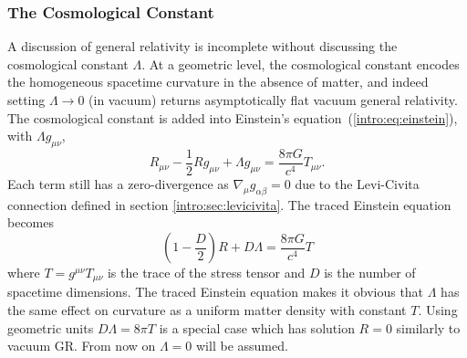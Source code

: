 \subsubsection{The Cosmological Constant} \label{intro:sec:cosmology}
A discussion of general relativity is incomplete without discussing the cosmological constant $\Lambda$. At a geometric level, the cosmological constant encodes the homogeneous spacetime curvature in the absence of matter, and indeed setting $\Lambda\rightarrow 0$ (in vacuum) returns asymptotically flat vacuum general relativity. The cosmological constant is added into Einstein's equation~(\ref{intro:eq:einstein}), with $\Lambda g_{\mu\nu}$,
\begin{equation} \label{intro:eq:einsteinlambda}
R_{\mu\nu}-\frac{1}{2}Rg_{\mu\nu}  +  \Lambda g_{\mu\nu} = \frac{8 \pi G}{c^4}T_{\mu\nu}.
\end{equation}
Each term still has a zero-divergence as $\nabla_\mu g_{\alpha\beta}=0$ due to the Levi-Civita connection defined in section \ref{intro:sec:levicivita}. The traced Einstein equation becomes
\begin{equation}
\left(1- \frac{D}{2}\right)R + D\Lambda = \frac{8\pi G}{c^4}T
\end{equation}
where $T=g^{\mu\nu}T_{\mu\nu}$ is the trace of the stress tensor and $D$ is the number of spacetime dimensions. The traced Einstein equation makes it obvious that $\Lambda$ has the same effect on curvature as a uniform matter density with constant $T$. Using geometric units $D\Lambda = 8\pi T$ is a special case which has solution $R=0$ similarly to vacuum GR. From now on $\Lambda=0$ will be assumed.






